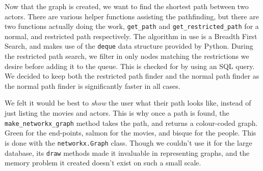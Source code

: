 \documentclass{article}
\begin{document}
Now that the graph is created, we want to find the shortest path between two actors. There are various helper functions assisting the pathfinding, but there are two functions actually doing the work, \verb+get_path+ and \verb+get_restricted_path+ for a normal, and restricted path respectively. The algorithm in use is a Breadth First Search, and makes use of the \verb+deque+ data structure provided by Python. During the restricted path search, we filter in only nodes matching the restrictions we desire before adding it to the queue. This is checked for by using an SQL query. We decided to keep both the restricted path finder and the normal path finder as the normal path finder is significantly faster in all cases.

We felt it would be best to \emph{show} the user what their path looks like, instead of just listing the movies and actors. This is why once a path is found, the \verb!make_networkx_graph! method takes the path, and returns a colour-coded graph. Green for the end-points, salmon for the movies, and bisque for the people. This is done with the \verb+networkx.Graph+ class. Though we couldn't use it for the large database, its \verb!draw! methods made it invaluable in representing graphs, and the memory problem it created doesn't exist on such a small scale.
\end{document}
